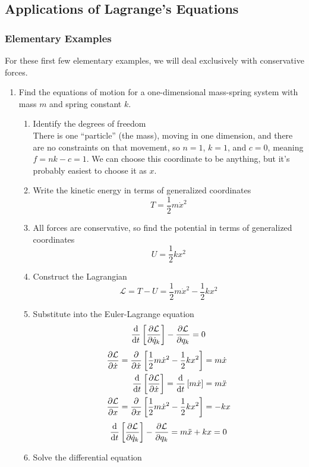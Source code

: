 \documentclass[a4paper]{article}
\begin{document}
\subsection{Applications of Lagrange's Equations}
\subsubsection{Elementary Examples}
For these first few elementary examples, we will deal exclusively with
conservative forces.

\begin{enumerate}[label=\arabic*.]
	\item Find the equations of motion for a one-dimensional
		mass-spring system with mass $m$ and spring constant $k$.
		\begin{enumerate}[label=\roman*.]
		\item Identify the degrees of freedom\\
			There is one ``particle'' (the mass), moving in one
			dimension, and there are no constraints on that
			movement, so $n = 1$, $k = 1$, and $c = 0$, meaning
			$f = nk-c = 1$. We can choose this coordinate
			to be anything, but it's probably easiest to choose it
			as $x$.
		\item Write the kinetic energy in terms of generalized
			coordinates
			\[ T = \frac{1}{2}m\dot{x}^2 \]
		\item All forces are conservative, so find the potential
			in terms of generalized coordinates
			\[ U = \frac{1}{2}kx^2 \]
		\item Construct the Lagrangian
			\[ \mathcal{L} = T - U = \frac{1}{2}m\dot{x}^2 -
			\frac{1}{2}kx^2 \]
		\item Substitute into the Euler-Lagrange equation
			\[
				\frac{\mathrm{d}}{\mathrm{d} t}\left[\frac{\partial \mathcal{L}}{\partial \dot{q}_k}
				\right] - \frac{\partial \mathcal{L}}{\partial q_k} = 0
			\]
			\begin{align*}
				\pder{\Lp}{\dot{x}} = \pd{\dot{x}}
				\left[\frac{1}{2}m\dot{x}^2-\frac{1}{2}k
				x^2\right]
				&= m\dot{x}\\
				\frac{\d}{\d t}\left[\pder{\Lp}{\dot{x}}\right]
				=\frac{\d}{\d t}\left[m\dot{x}\right]
				&=m\ddot{x}\\
				\pder{\Lp}{x} = \pd{x}\left[\frac{1}{2}
				m\dot{x}^2-\frac{1}{2}kx^2\right]
				&= -kx\\
			\end{align*}
			\[
				\frac{\mathrm{d}}{\mathrm{d} t}\left[\frac{\partial \mathcal{L}}{\partial \dot{q}_k}
				\right] - \frac{\partial \mathcal{L}}{\partial q_k} =
				m\ddot{x}+kx = 0
			\]
		\item Solve the differential equation\\

\end{enumerate}
\end{enumerate}
\end{document}
